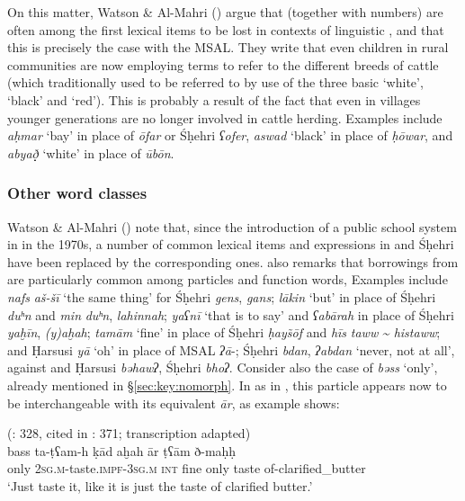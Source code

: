 \documentclass[output=paper]{langsci/langscibook}
\begin{document}
On this matter, Watson \& Al-Mahri (\citeyear[90]{WatsonAl-Mahri2017}) argue that  (together with numbers) are often among the first lexical items to be lost in contexts of linguistic , and that this is precisely the case with the MSAL. They write that even children in rural communities are now employing  terms to refer to the different breeds of cattle (which traditionally used to be referred to by use of the three basic  ‘white’, ‘black’ and ‘red’). This is probably a result of the fact that even in villages younger generations are no longer involved in cattle herding. Examples include \textit{aḥmar} ‘bay’ in place of  \textit{ōfar} or Śḥehri \textit{ʕofer}, \textit{aswad} ‘black’ in place of  \textit{ḥōwar}, and \textit{abya\d{ð}}̣ ‘white’ in place of  \textit{ūbōn}.


 \subsubsection{Other word classes}\largerpage

Watson \& Al-Mahri (\citeyear[90]{WatsonAl-Mahri2017}) note that, since the introduction of a public school system in  in the 1970s, a number of common lexical items and expressions in  and Śḥehri have been replaced by the corresponding  ones. \citet{Lonnet2011} also remarks that borrowings from  are particularly common among particles and function words, Examples include \textit{nafs} \textit{aš-šī} ‘the same thing’ for Śḥehri \textit{gens},  \textit{gans}; \textit{lākin} ‘but’ in place of Śḥehri \textit{duʰn} and \textit{min} \textit{duʰn},  \textit{lahinnah}; \textit{yaʕnī} ‘that is to say’ and \textit{ʕabārah} in place of Śḥehri \textit{yaḫīn},  \textit{(y)aḫah}; \textit{tamām} ‘fine’ in place of Śḥehri \textit{ḥay\~{s}ōf} and  \textit{hīs} \textit{taww} \textit{{\textasciitilde} histaww};  and Ḥarsusi  \textit{yā} ‘oh’ in place of MSAL \textit{ʔā}-; Śḥehri \textit{bdan},  \textit{ʔabdan} ‘never, not at all’, against  and Ḥarsusi \textit{bəhawʔ}, Śḥehri \textit{bhoʔ}. Consider also the case of  \textit{bəss} ‘only’, already mentioned in §\ref{sec:key:nomorph}. In  as in , this particle appears now to be interchangeable with its equivalent \textit{ār}, as example  shows:

\ea\label{ex:key:sima}
{ (\citealt{Sima2009}: 328, cited in \citealt{Watson2012}: 371; transcription adapted)}\\
\gll bass ta-ṭʕam-h ḳād aḫah ār ṭʕām ð-maḥḥ\\
     only 2\textsc{sg.m}-taste.\textsc{impf-3sg.m} \textsc{int} fine only taste of-clarified\_butter\\
\glt `Just taste it, like it is just the taste of clarified butter.' 
\z
\end{document}
